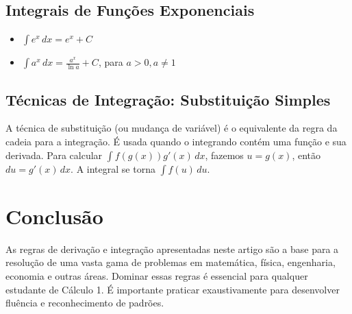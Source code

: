 \documentclass{article}
\begin{document}
\subsection{Integrais de Funções Exponenciais}
\begin{itemize}
    \item $ \int e^x \, dx = e^x + C $
    \item $ \int a^x \, dx = \frac{a^x}{\ln a} + C $, para $a > 0, a \neq 1$
\end{itemize}

\subsection{Técnicas de Integração: Substituição Simples}
A técnica de substituição (ou mudança de variável) é o equivalente da regra da cadeia para a integração. É usada quando o integrando contém uma função e sua derivada.
Para calcular $\int f(g(x))g'(x) \, dx$, fazemos $u = g(x)$, então $du = g'(x) \, dx$. A integral se torna $\int f(u) \, du$.

\section{Conclusão}
As regras de derivação e integração apresentadas neste artigo são a base para a resolução de uma vasta gama de problemas em matemática, física, engenharia, economia e outras áreas. Dominar essas regras é essencial para qualquer estudante de Cálculo 1. É importante praticar exaustivamente para desenvolver fluência e reconhecimento de padrões.
\end{document}

